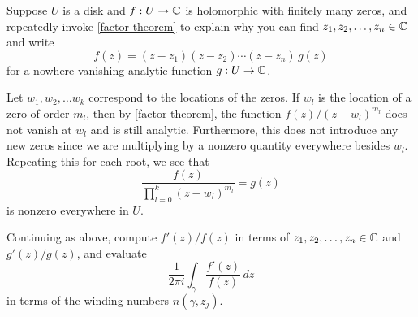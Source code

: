 \documentclass{homework}
\begin{document}
                                                      \begin{problem}
                                                        Suppose $U$ is a disk and $f : U \to \mathbb{C}$ is holomorphic with
                                                          finitely many zeros, and repeatedly invoke \ref{factor-theorem} to
                                                            explain why you can find $z_1,z_2,\ldots,z_n \in \mathbb{C}$ and write
                                                              \[
                                                                  f(z) = (z-z_1)(z-z_2) \cdots (z-z_n) \, g(z)
                                                                    \]
                                                                      for a nowhere-vanishing analytic function $g : U \to \mathbb{C}$.
                                                                      \end{problem}
                                                                      \begin{solution}
                                                                      Let $w_1, w_2, \dots w_k$ correspond to the locations of the zeros. If $w_l$ is the location of a zero of order $m_l$, then by \ref{factor-theorem}, the function $f(z)/ (z-w_l)^{m_l}$ does not vanish at $w_l$ and is still analytic. Furthermore, this does not introduce any new zeros since we are multiplying by a nonzero quantity everywhere besides $w_l$. Repeating this for each root, we see that
                                                                      \[
                                                                      \frac{f(z)}{\prod_{l=0}^k (z-w_l)^{m_l}} = g(z)
                                                                      \]
                                                                      is nonzero everywhere in $U$.
                                                                      \end{solution}
                                                                      \begin{problem}\label{argument-principle-zeros}
                                                                        Continuing as above, compute $f'(z)/f(z)$ in terms of $z_1,z_2,\ldots,z_n \in \mathbb{C}$ and $g'(z)/g(z)$, and evaluate
                                                                          \[
                                                                              \frac{1}{2\pi i} \int_\gamma \frac{f'(z)}{f(z)} \, dz
                                                                                \]
                                                                                  in terms of the winding numbers $n(\gamma,z_j)$.
                                                                                  \end{problem}
\end{document}
